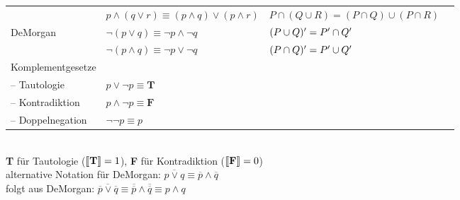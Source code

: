 \begin{frame}
{\begin{tabular}[h]{llll}
                                 & $p\wedge(q\vee r) \equiv (p\wedge q)\vee(p\wedge r)$       & $P\cap(Q\cup R)=(P\cap Q)\cup(P\cap R)$     &  \\
       \alert{DeMorgan}          & \alert{$\neg(p\vee q)\equiv\neg p\wedge\neg q$}            & $(P\cup Q)^{\prime}=P^{\prime}\cap Q^{\prime}$             &  \\
                                 & $\neg(p\wedge q)\equiv\neg p\vee\neg q$                    & $(P\cap Q)^{\prime}=P^{\prime}\cup Q^{\prime}$             &  \\
             Komplementgesetze   &&& \\
       -- \alert{Tautologie}     & \alert{$p\vee\neg p\equiv\textbf{T}$} && \\
       -- \alert{Kontradiktion}  & \alert{$p\wedge\neg p\equiv\textbf{F}$} && \\
       -- \alert{Doppelnegation} & \alert{$\neg\neg p\equiv p$} && \\
    \end{tabular}%
  }\\
  \Halbzeile 
  \onslide<+->
  \raggedleft
  \scriptsize \textbf{T} für Tautologie (${\llbracket{}\textbf{T}\rrbracket}=1$), \textbf{F} für Kontradiktion (${\llbracket{}\textbf{F}\rrbracket}=0$)\\
  alternative Notation für DeMorgan: $\overline{p\vee q}\equiv\overline{p}\wedge\overline{q}$\\
  folgt aus DeMorgan: $\overline{\overline{p}\vee\overline{q}}\equiv\overline{\overline{p}}\wedge\overline{\overline{q}}\equiv p\wedge q$
\end{frame}

